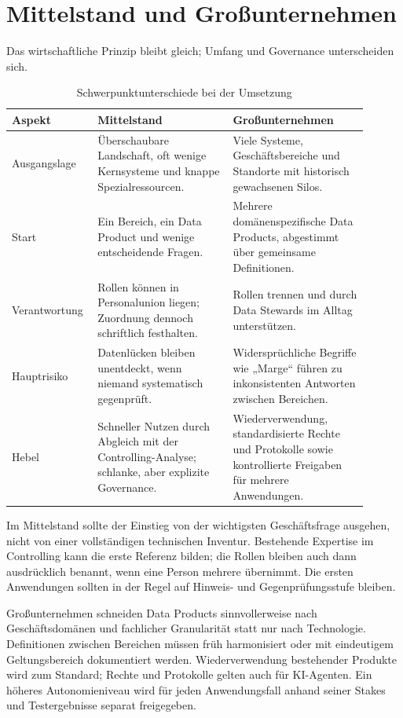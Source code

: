 \documentclass[a4paper,12pt,twoside]{report}
\theoremstyle{definition}
\begin{document}
\section{Mittelstand und Großunternehmen}
Das wirtschaftliche Prinzip bleibt gleich; Umfang und Governance unterscheiden sich.
\begin{table}[htbp]
\centering
\small
\caption{Schwerpunktunterschiede bei der Umsetzung}
\label{tab:company-size}
\begin{tabular}{p{0.18\linewidth}p{0.36\linewidth}p{0.36\linewidth}}
\toprule
\textbf{Aspekt} & \textbf{Mittelstand} & \textbf{Großunternehmen} \\
\midrule
Ausgangslage & Überschaubare Landschaft, oft wenige Kernsysteme und knappe Spezialressourcen. & Viele Systeme, Geschäftsbereiche und Standorte mit historisch gewachsenen Silos. \\
Start & Ein Bereich, ein Data Product und wenige entscheidende Fragen. & Mehrere domänenspezifische Data Products, abgestimmt über gemeinsame Definitionen. \\
Verantwortung & Rollen können in Personalunion liegen; Zuordnung dennoch schriftlich festhalten. & Rollen trennen und durch Data Stewards im Alltag unterstützen. \\
Hauptrisiko & Datenlücken bleiben unentdeckt, wenn niemand systematisch gegenprüft. & Widersprüchliche Begriffe wie „Marge“ führen zu inkonsistenten Antworten zwischen Bereichen. \\
Hebel & Schneller Nutzen durch Abgleich mit der Controlling-Analyse; schlanke, aber explizite Governance. & Wiederverwendung, standardisierte Rechte und Protokolle sowie kontrollierte Freigaben für mehrere Anwendungen. \\
\bottomrule
\end{tabular}
\end{table}

Im Mittelstand sollte der Einstieg von der wichtigsten Geschäftsfrage ausgehen, nicht von einer vollständigen technischen Inventur. Bestehende Expertise im Controlling kann die erste Referenz bilden; die Rollen bleiben auch dann ausdrücklich benannt, wenn eine Person mehrere übernimmt. Die ersten Anwendungen sollten in der Regel auf Hinweis- und Gegenprüfungsstufe bleiben.

Großunternehmen schneiden Data Products sinnvollerweise nach Geschäftsdomänen und fachlicher Granularität statt nur nach Technologie. Definitionen zwischen Bereichen müssen früh harmonisiert oder mit eindeutigem Geltungsbereich dokumentiert werden. Wiederverwendung bestehender Produkte wird zum Standard; Rechte und Protokolle gelten auch für KI-Agenten. Ein höheres Autonomieniveau wird für jeden Anwendungsfall anhand seiner Stakes und Testergebnisse separat freigegeben.
\end{document}
